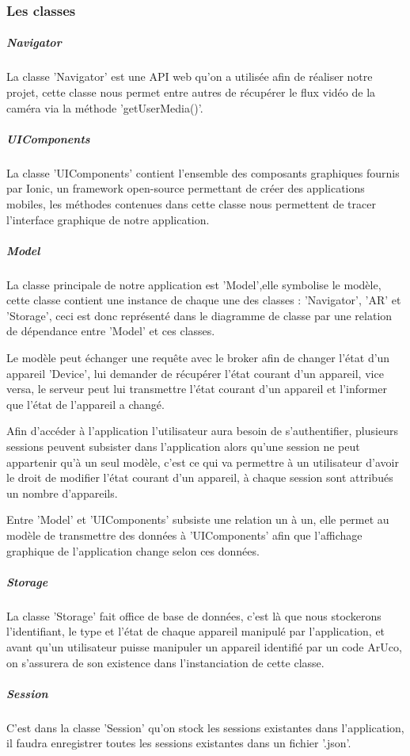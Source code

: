 \documentclass[12pt,a4paper]{article}
\begin{document}
\subsubsection{Les classes}
\subparagraph{Navigator}
La classe 'Navigator' est une API web qu'on a utilisée afin de réaliser notre projet, cette classe nous permet entre autres de récupérer le flux vidéo de la caméra via la méthode 'getUserMedia()'.\par
\subparagraph{UIComponents}
La classe 'UIComponents' contient l'ensemble des composants graphiques fournis par Ionic, un framework open-source permettant de créer des applications mobiles, les méthodes contenues dans cette classe nous permettent de tracer l'interface graphique de notre application.\par
\subparagraph{Model}
La classe principale de notre application est 'Model',elle symbolise le modèle, cette classe contient une instance de chaque une des classes : 'Navigator', 'AR' et 'Storage', ceci est donc représenté dans le diagramme de classe par une relation de dépendance entre 'Model' et ces classes.\par%
Le modèle peut échanger une requête avec le broker afin de changer l'état d'un appareil 'Device', lui demander de récupérer l'état courant d'un appareil, vice versa, le serveur peut lui transmettre l'état courant d'un appareil et l'informer que l'état de l'appareil a changé.\par
Afin d'accéder à l'application l'utilisateur aura besoin de s'authentifier, plusieurs sessions peuvent subsister dans l'application alors qu'une session ne peut appartenir qu'à un seul modèle, c'est ce qui va permettre à un utilisateur d'avoir le droit de modifier l'état courant d'un appareil, à chaque session sont attribués un nombre d'appareils.\par
Entre 'Model' et 'UIComponents' subsiste une relation un à un, elle permet au modèle de transmettre des données à 'UIComponents' afin que l'affichage graphique de l'application change selon ces données.\par
\subparagraph{Storage}
La classe 'Storage' fait office de base de données, c'est là que nous stockerons l'identifiant, le type et l'état de chaque appareil manipulé par l'application, et avant qu'un utilisateur puisse manipuler un appareil identifié par un code ArUco, on s'assurera de son existence dans l'instanciation de cette classe.\par
\subparagraph{Session}
C'est dans la classe 'Session' qu'on stock les sessions existantes dans l'application, il faudra enregistrer toutes les sessions existantes dans un fichier '.json'.\par 
\end{document}
